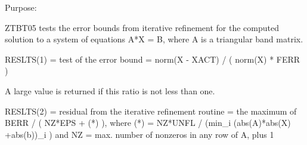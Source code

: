 \begin{DoxyParagraph}{Purpose\+: }
\begin{DoxyVerb} ZTBT05 tests the error bounds from iterative refinement for the
 computed solution to a system of equations A*X = B, where A is a
 triangular band matrix.

 RESLTS(1) = test of the error bound
           = norm(X - XACT) / ( norm(X) * FERR )

 A large value is returned if this ratio is not less than one.

 RESLTS(2) = residual from the iterative refinement routine
           = the maximum of BERR / ( NZ*EPS + (*) ), where
             (*) = NZ*UNFL / (min_i (abs(A)*abs(X) +abs(b))_i )
             and NZ = max. number of nonzeros in any row of A, plus 1\end{DoxyVerb}
 
\end{DoxyParagraph}

